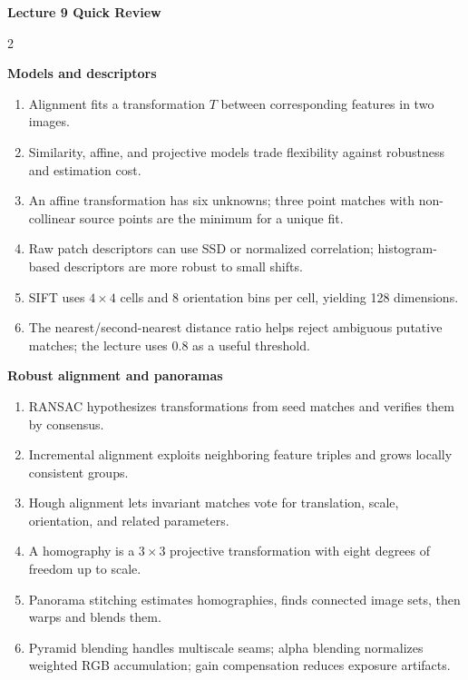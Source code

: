 \documentclass[11pt,a4paper,oneside]{report}
\newcommand{\reviewgroup}[1]{%
  \par\vspace{0.7em}%
  {\sffamily\bfseries\color{SapienzaRed}#1}\par\vspace{0.10em}%
}
\begin{document}
\clearpage
{}
{}
\begin{center}
{\sffamily\fontsize{22}{26}\selectfont\bfseries\color{Ink}Lecture 9 Quick Review\par}
\vspace{0.35em}{\color{SapienzaRed}\rule{0.82\textwidth}{0.8pt}}
\end{center}
\begin{multicols}{2}
\normalsize
\reviewgroup{Models and descriptors}
\begin{enumerate}[label=\textcolor{SapienzaRed}{\bfseries\arabic*.},leftmargin=1.8em,itemsep=0.36em]
\item Alignment fits a transformation $T$ between corresponding features in two images.
\item Similarity, affine, and projective models trade flexibility against robustness and estimation cost.
\item An affine transformation has six unknowns; three point matches with non-collinear source points are the minimum for a unique fit.
\item Raw patch descriptors can use SSD or normalized correlation; histogram-based descriptors are more robust to small shifts.
\item SIFT uses $4\times4$ cells and 8 orientation bins per cell, yielding 128 dimensions.
\item The nearest/second-nearest distance ratio helps reject ambiguous putative matches; the lecture uses $0.8$ as a useful threshold.
\end{enumerate}
\reviewgroup{Robust alignment and panoramas}
\begin{enumerate}[resume,label=\textcolor{SapienzaRed}{\bfseries\arabic*.},leftmargin=1.8em,itemsep=0.36em]
\item RANSAC hypothesizes transformations from seed matches and verifies them by consensus.
\item Incremental alignment exploits neighboring feature triples and grows locally consistent groups.
\item Hough alignment lets invariant matches vote for translation, scale, orientation, and related parameters.
\item A homography is a $3\times3$ projective transformation with eight degrees of freedom up to scale.
\item Panorama stitching estimates homographies, finds connected image sets, then warps and blends them.
\item Pyramid blending handles multiscale seams; alpha blending normalizes weighted RGB accumulation; gain compensation reduces exposure artifacts.
\end{enumerate}
\end{multicols}
\end{document}

